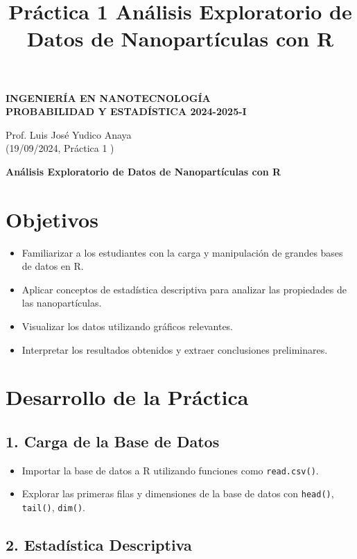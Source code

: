 \documentclass{article}
\title{Práctica 1 Análisis Exploratorio de Datos de Nanopartículas con R}
\author{}
\date{}
\begin{document}
\begin{center}
\textbf{INGENIER\'IA EN NANOTECNOLOG\'IA \\
PROBABILIDAD Y ESTAD\'{I}STICA 2024-2025-I}
\vspace{.1cm}

Prof. Luis Jos\'{e} Yudico Anaya\\
 \hspace{.5cm}(19/09/2024, Práctica 1 )
\end{center}

\textbf{Análisis Exploratorio de Datos de Nanopartículas con R}



\section*{Objetivos}
\begin{itemize}
    \item Familiarizar a los estudiantes con la carga y manipulaci\'on de grandes bases de datos en R.
    \item Aplicar conceptos de estad\'istica descriptiva para analizar las propiedades de las nanopart\'iculas.
    \item Visualizar los datos utilizando gr\'aficos relevantes.
    \item Interpretar los resultados obtenidos y extraer conclusiones preliminares.
\end{itemize}

\section*{Desarrollo de la Pr\'actica}

\subsection*{1. Carga de la Base de Datos}
\begin{itemize}
    \item Importar la base de datos a R utilizando funciones como \texttt{read.csv()}.
    \item Explorar las primeras filas y dimensiones de la base de datos con \texttt{head()}, \texttt{tail()}, \texttt{dim()}.
\end{itemize}

\subsection*{2. Estad\'istica Descriptiva}
\end{document}
